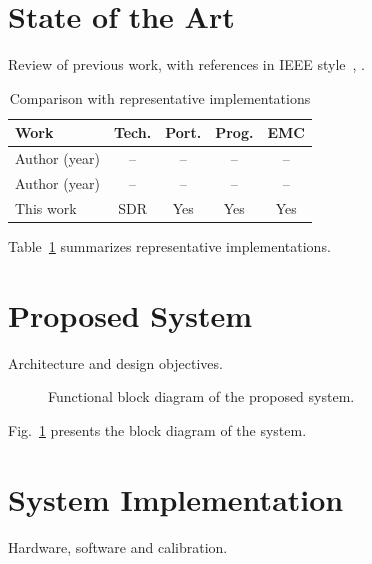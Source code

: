 \documentclass[conference]{IEEEtran}
\begin{document}
\section{State of the Art}\label{sec:state}

Review of previous work, with references in IEEE style~\cite{b1}, \cite{b2}.

\begin{table}[htbp]
  \caption{Comparison with representative implementations}
  \label{tab:comparison}
  \centering
  \begin{tabular}{@{}lcccc@{}}
    \toprule
    Work & Tech. & Port. & Prog. & EMC \\
    \midrule
    Author (year) & -- & -- & -- & -- \\
    Author (year) & -- & -- & -- & -- \\
    This work     & SDR & Yes & Yes & Yes \\
    \bottomrule
  \end{tabular}
\end{table}

Table~\ref{tab:comparison} summarizes representative implementations.

\section{Proposed System}\label{sec:proposed}

Architecture and design objectives.

\begin{figure}[htbp]
  \centering
  \caption{Functional block diagram of the proposed system.}
  \label{fig:block}
\end{figure}

Fig.~\ref{fig:block} presents the block diagram of the system.

\section{System Implementation}\label{sec:implementation}

Hardware, software and calibration.
\end{document}
